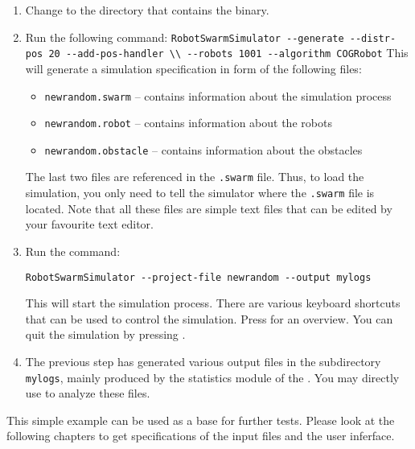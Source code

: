 \begin{enumerate}
	\item Change to the directory that contains the \RSS binary.
	\item Run the following command:
		\texttt{RobotSwarmSimulator -{}-generate -{}-distr-pos 20 -{}-add-pos-handler \textbackslash\textbackslash
			\linebreak -{}-robots 1001 -{}-algorithm COGRobot}
		This will generate a simulation specification in form of the following files:
		\begin{itemize}
			\item {\tt newrandom.swarm} -- contains information about the simulation process
			\item {\tt newrandom.robot} -- contains information about the robots
			\item {\tt newrandom.obstacle} -- contains information about the obstacles
		\end{itemize}
		The last two files are referenced in the {\tt .swarm} file. Thus, to load the simulation, you only need to tell the simulator where the {\tt .swarm} file is located. Note that all these files are simple text files that can be edited by your favourite text editor.
	\item Run the command:

		\centerline{\tt RobotSwarmSimulator -{}-project-file newrandom -{}-output mylogs}

		This will start the simulation process. There are various keyboard shortcuts that can be used to control the simulation. Press  for an overview. You can quit the simulation by pressing .
	\item The previous step has generated various output files in the subdirectory {\tt mylogs}, mainly produced by the statistics module of the \RSS. You may directly use \gnuplot to analyze these files.
\end{enumerate}
This simple example can be used as a base for further tests. Please look at the following chapters to get specifications of the input files and the user inferface.
